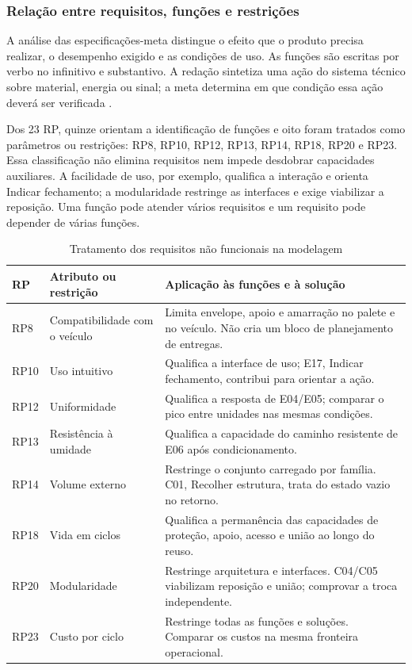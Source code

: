 \subsubsection{Relação entre requisitos, funções e restrições}
\label{sec:requisitos-funcoes}

A análise das especificações-meta distingue o efeito que o produto precisa realizar, o desempenho exigido e as condições de uso. As funções são escritas por verbo no infinitivo e substantivo. A redação sintetiza uma ação do sistema técnico sobre material, energia ou sinal; a meta determina em que condição essa ação deverá ser verificada \citep{back2008,aulasmodelagem}.

Dos 23 RP, quinze orientam a identificação de funções e oito foram tratados como parâmetros ou restrições: RP8, RP10, RP12, RP13, RP14, RP18, RP20 e RP23. Essa classificação não elimina requisitos nem impede desdobrar capacidades auxiliares. A facilidade de uso, por exemplo, qualifica a interação e orienta Indicar fechamento; a modularidade restringe as interfaces e exige viabilizar a reposição. Uma função pode atender vários requisitos e um requisito pode depender de várias funções.

\begin{table}[H]
\caption{Tratamento dos requisitos não funcionais na modelagem}
\label{tab:requisito-funcao}
\centering\footnotesize
\begin{tabularx}{\textwidth}{L{1.0cm}L{3.0cm}Y}
\toprule\textbf{RP}&\textbf{Atributo ou restrição}&\textbf{Aplicação às funções e à solução}\\\midrule
RP8&Compatibilidade com o veículo&Limita envelope, apoio e amarração no palete e no veículo. Não cria um bloco de planejamento de entregas.\\
RP10&Uso intuitivo&Qualifica a interface de uso; E17, Indicar fechamento, contribui para orientar a ação.\\
RP12&Uniformidade&Qualifica a resposta de E04/E05; comparar o pico entre unidades nas mesmas condições.\\
RP13&Resistência à umidade&Qualifica a capacidade do caminho resistente de E06 após condicionamento.\\
RP14&Volume externo&Restringe o conjunto carregado por família. C01, Recolher estrutura, trata do estado vazio no retorno.\\
RP18&Vida em ciclos&Qualifica a permanência das capacidades de proteção, apoio, acesso e união ao longo do reuso.\\
RP20&Modularidade&Restringe arquitetura e interfaces. C04/C05 viabilizam reposição e união; comprovar a troca independente.\\
RP23&Custo por ciclo&Restringe todas as funções e soluções. Comparar os custos na mesma fronteira operacional.\\
\bottomrule\end{tabularx}
\end{table}

